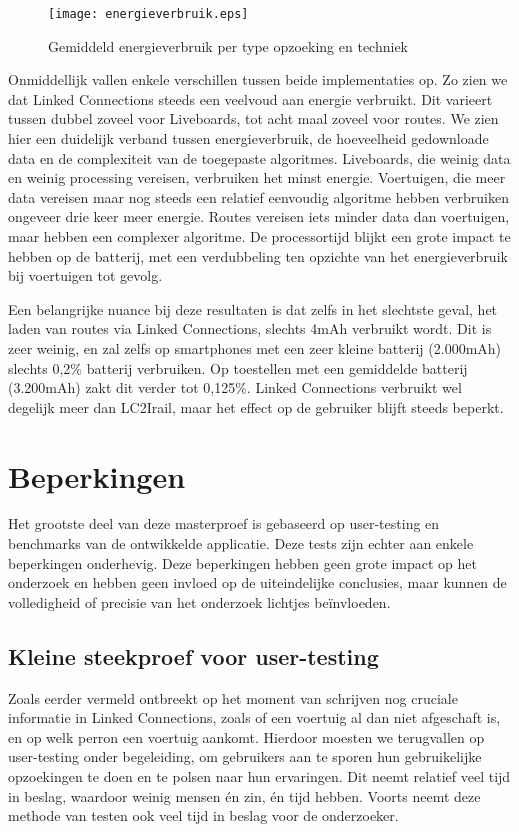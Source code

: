 \begin{figure}[ht]
	\centering
	\texttt{[image: energieverbruik.eps]}
	\caption[Energieverbruik per opzoeking]{Gemiddeld energieverbruik per type opzoeking en techniek}
	\label{fig:batteryUsage}
\end{figure}

Onmiddellijk vallen enkele verschillen tussen beide implementaties op. Zo zien we dat Linked Connections steeds een veelvoud aan energie verbruikt. Dit varieert tussen dubbel zoveel voor Liveboards, tot acht maal zoveel voor routes. We zien hier een duidelijk verband tussen energieverbruik, de hoeveelheid gedownloade data en de complexiteit van de toegepaste algoritmes.
Liveboards, die weinig data en weinig processing vereisen, verbruiken het minst energie. Voertuigen, die meer data vereisen maar nog steeds een relatief eenvoudig algoritme hebben verbruiken ongeveer drie keer meer energie. Routes vereisen iets minder data dan voertuigen,  maar hebben een complexer algoritme. De processortijd blijkt een grote impact te hebben op de batterij, met een verdubbeling ten opzichte van het energieverbruik bij voertuigen tot gevolg.

Een belangrijke nuance bij deze resultaten is dat zelfs in het slechtste geval, het laden van routes via Linked Connections, slechts 4mAh verbruikt wordt. Dit is zeer weinig, en zal zelfs op smartphones met een zeer kleine batterij (2.000mAh) slechts 0,2\% batterij verbruiken. Op toestellen met een gemiddelde batterij (3.200mAh) zakt dit verder tot 0,125\%. Linked Connections verbruikt wel degelijk meer dan LC2Irail, maar het effect op de gebruiker blijft steeds beperkt.

\section{Beperkingen}
\label{sec:beperkingen}

Het grootste deel van deze masterproef is gebaseerd op user-testing en benchmarks van de ontwikkelde applicatie. Deze tests zijn echter aan enkele beperkingen onderhevig. Deze beperkingen hebben geen grote impact op het onderzoek en hebben geen invloed op de uiteindelijke conclusies, maar kunnen de volledigheid of precisie van het onderzoek lichtjes beïnvloeden.

\subsection{Kleine steekproef voor user-testing}
Zoals eerder vermeld ontbreekt op het moment van schrijven nog cruciale informatie in Linked Connections, zoals of een voertuig al dan niet afgeschaft is, en op welk perron een voertuig aankomt. Hierdoor moesten we terugvallen op user-testing onder begeleiding, om gebruikers aan te sporen hun gebruikelijke opzoekingen te doen en te polsen naar hun ervaringen. Dit neemt relatief veel tijd in beslag, waardoor weinig mensen én zin, én tijd hebben. Voorts neemt deze methode van testen ook veel tijd in beslag voor de onderzoeker. 

